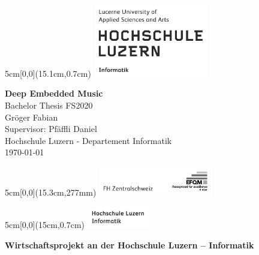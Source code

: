 \begin{titlepage}
	\begin{textblock*}{5cm}[0,0](15.1cm,0.7cm)
		\includegraphics[keepaspectratio,width=5cm]{img/HSLU_Logo}
	\end{textblock*}
	\begin{center}
		\vspace*{5cm}
		\Huge{\textbf{Deep Embedded Music}} \\
		\vspace{0.5em}
		\Large{Bachelor Thesis FS2020}\\
		\vspace{3em}
		\LARGE{Gröger Fabian}\\
		\vspace{1em}
		\Large{Supervisor: Pfäffli Daniel}\\
		\vfill
		\large{Hochschule Luzern - Departement Informatik}\\
		\large{\today}\\
	\end{center}
	\begin{textblock*}{5cm}[0,0](15.3cm,277mm)
		\includegraphics[keepaspectratio,width=5cm]{img/FHZ_Logo}
	\end{textblock*}
\end{titlepage}

\newpage


\begin{textblock*}{5cm}[0,0](15cm,0.7cm)
	\includegraphics[keepaspectratio,width=2.7cm]{img/HSLU_Logo_Header}
\end{textblock*}

\vspace{0.6cm}
\noindent
\textbf{\Large{Wirtschaftsprojekt an der Hochschule Luzern – Informatik}}

